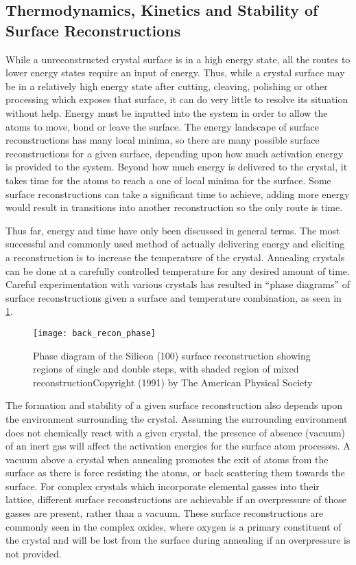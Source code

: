 \subsection{Thermodynamics, Kinetics and Stability of Surface Reconstructions}
While a unreconstructed crystal surface is in a high energy state, all the routes to lower energy states require an input of energy. Thus, while a crystal surface may be in a relatively high energy state after cutting, cleaving, polishing or other processing which exposes that surface, it can do very little to resolve its situation without help. Energy must be inputted into the system in order to allow the atoms to move, bond or leave the surface. The energy landscape of surface reconstructions has many local minima, so there are many possible surface reconstructions for a given surface, depending upon how much activation energy is provided to the system. Beyond how much energy is delivered to the crystal, it takes time for the atoms to reach a one of local minima for the surface. Some surface reconstructions can take a significant time to achieve, adding more energy would result in transitions into another reconstruction so the only route is time.

Thus far, energy and time have only been discussed in general terms. The most successful and commonly used method of actually delivering energy and eliciting a reconstruction is to increase the temperature of the crystal. Annealing crystals can be done at a carefully controlled temperature for any desired amount of time. Careful experimentation with various crystals has resulted in ``phase diagrams'' of surface reconstructions given a surface and temperature combination, as seen in \cref{fig:back_recon_phase}.
\begin{figure}
    \centering
    \texttt{[image: back\_recon\_phase]}
    \caption[Silicon surface reconstruction phase diagram]{\label{fig:back_recon_phase}Phase diagram of the Silicon (100) surface reconstruction showing regions of single and double steps, with shaded region of mixed reconstruction\cite{Pehlke1991}Copyright (1991) by The American Physical Society}
\end{figure}

The formation and stability of a given surface reconstruction also depends upon the environment surrounding the crystal. Assuming the surrounding environment does not chemically react with a given crystal, the presence of absence (vacuum) of an inert gas will affect the activation energies for the surface atom processes. A vacuum above a crystal when annealing promotes the exit of atoms from the surface as there is force resisting the atoms, or back scattering them towards the surface. For complex crystals which incorporate elemental gasses into their lattice, different surface reconstructions are achievable if an overpressure of those gasses are present, rather than a vacuum. These surface reconstructions are commonly seen in the complex oxides, where oxygen is a primary constituent of the crystal and will be lost from the surface during annealing if an overpressure is not provided.

